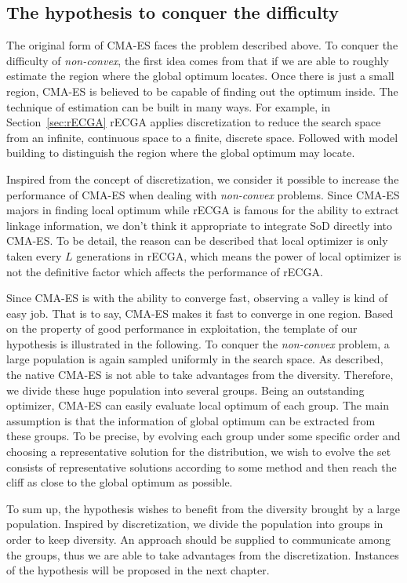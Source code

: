\subsection{The hypothesis to conquer the
                    difficulty}

The original form of CMA-ES faces the problem
described above.  To conquer the difficulty of
\emph{non-convex}, the first idea comes from that if
we are able to roughly estimate the region where the
global optimum locates.  Once there is just a small
region, CMA-ES is believed to be capable of finding
out the optimum inside.  The technique of estimation
can be built in many ways.  For example, in
Section~\ref{sec:rECGA} rECGA applies discretization
to reduce the search space from an infinite,
continuous space to a finite, discrete space.
Followed with model building to distinguish the
region where the global optimum may locate.

Inspired from the concept of discretization, we
consider it possible to increase the performance of
CMA-ES when dealing with \emph{non-convex} problems.
Since CMA-ES majors in finding local optimum while
rECGA is famous for the ability to extract linkage
information, we don't think it appropriate to
integrate SoD directly into CMA-ES.  To be detail,
the reason can be described that local optimizer is
only taken every $L$ generations in rECGA, which
means the power of local optimizer is not the
definitive factor which affects the performance of
rECGA.

Since CMA-ES is with the ability to converge fast,
observing a valley is kind of easy job.  That is to
say, CMA-ES makes it fast to converge in one region.
Based on the property of good performance in
exploitation, the template of our hypothesis is
illustrated in the following.  To conquer the
\emph{non-convex} problem, a large population is
again sampled uniformly in the search space.  As
described, the native CMA-ES is not able to take
advantages from the diversity.  Therefore, we divide
these huge population into several groups.  Being an
outstanding optimizer, CMA-ES can easily evaluate
local optimum of each group.  The main assumption is
that the information of global optimum can be
extracted from these groups.  To be precise, by
evolving each group under some specific order and
choosing a representative solution for the
distribution, we wish to evolve the set consists of
representative solutions according to some method
and then reach the cliff as close to the global
optimum as possible.

To sum up, the hypothesis wishes to benefit from the
diversity brought by a large population.  Inspired
by discretization, we divide the population into
groups in order to keep diversity.  An approach
should be supplied to communicate among the groups,
thus we are able to take advantages from the
discretization. Instances of the hypothesis will be
proposed in the next chapter.  
